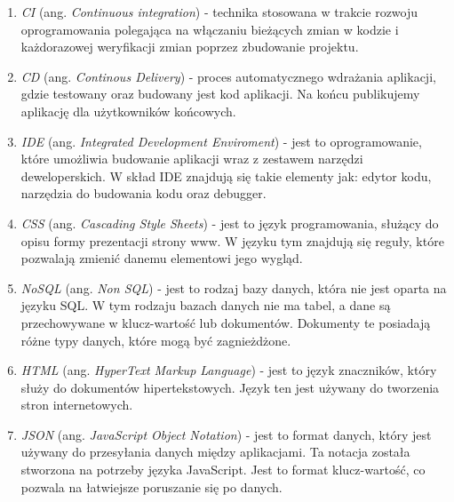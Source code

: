 \begin{enumerate}
    \item \label{CI} \textit{CI} (ang. \textit{Continuous integration}) - technika stosowana w trakcie rozwoju oprogramowania polegająca na włączaniu bieżących zmian w kodzie i każdorazowej weryfikacji zmian poprzez zbudowanie projektu.
    \item \label{CD} \textit{CD} (ang. \textit{Continous Delivery}) - proces automatycznego wdrażania aplikacji, gdzie testowany oraz budowany jest kod aplikacji. Na końcu publikujemy aplikację dla użytkowników końcowych.
    \item \label{IDE} \textit{IDE} (ang. \textit{Integrated Development Enviroment}) - jest to oprogramowanie, które umożliwia budowanie aplikacji wraz z zestawem narzędzi deweloperskich. W skład IDE znajdują się takie elementy jak: edytor kodu, narzędzia do budowania kodu oraz debugger.
    \item \label{CSS} \textit{CSS} (ang. \textit{Cascading Style Sheets}) - jest to język programowania, służący do opisu formy prezentacji strony www. W języku tym znajdują się reguły, które pozwalają zmienić danemu elementowi jego wygląd.
    \item \label{NoSQL} \textit{NoSQL} (ang. \textit{Non SQL}) - jest to rodzaj bazy danych, która nie jest oparta na języku SQL. W tym rodzaju bazach danych nie ma tabel, a dane są przechowywane w klucz-wartość lub dokumentów. Dokumenty te posiadają różne typy danych, które mogą być zagnieżdżone.
    \item \label{HTML} \textit{HTML} (ang. \textit{HyperText Markup Language}) - jest to język znaczników, który służy do dokumentów hipertekstowych. Język ten jest używany do tworzenia stron internetowych.
    \item \label{JSON} \textit{JSON} (ang. \textit{JavaScript Object Notation}) - jest to format danych, który jest używany do przesyłania danych między aplikacjami. Ta notacja została stworzona na potrzeby języka JavaScript. Jest to format klucz-wartość, co pozwala na łatwiejsze poruszanie się po danych.
\end{enumerate}
